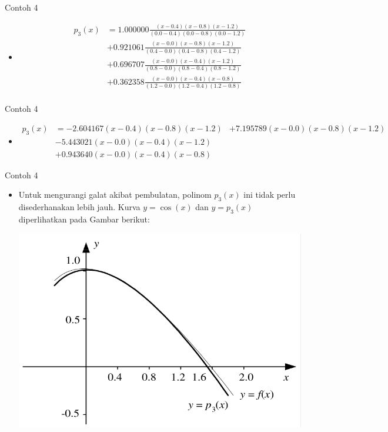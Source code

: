 \documentclass[pdflatex,compress,mathserif]{beamer}
\begin{document}
\begin{frame}{Contoh 4}
	\begin{itemize}
		\item[]
		\begin{align*}
		p_3 (x) &= 1.000000 \frac{(x-0.4)(x-0.8)(x-1.2)}{(0.0-0.4)(0.0-0.8)(0.0-1.2)} \\
		&+ 0.921061 \frac{(x - 0.0 )(x - 0.8)(x - 1.2)}{(0.4 - 0.0)( 0.4 - 0.8 )( 0.4 - 1.2 )} \\
		&+ 0.696707 \frac{(x - 0.0 )(x - 0.4)(x - 1.2)}{(0.8 - 0.0)( 0.8 - 0.4 )( 0.8 - 1.2 )} \\
		&+ 0.362358 \frac{(x - 0.0 )(x - 0.4)(x - 0.8)}{(1.2 - 0.0)( 1.2 - 0.4 )( 1.2 - 0.8 )} \\
		\end{align*}
	\end{itemize}
\end{frame}

\begin{frame}{Contoh 4}
	\begin{itemize}
		\item[]
		\begin{align*}
		p_3 (x) &= - 2.604167 ( x - 0.4 )( x - 0.8 )( x - 1.2 )
		&+ 7.195789 ( x - 0.0 )( x - 0.8 )( x - 1.2 ) \\
		&- 5.443021 ( x - 0.0 )( x - 0.4 )( x - 1.2 )\\
		&+ 0.943640 ( x - 0.0 )( x - 0.4 )( x - 0.8 )
		\end{align*}
	\end{itemize}
\end{frame}

\begin{frame}{Contoh 4}
	\begin{itemize}
		\item Untuk mengurangi galat akibat pembulatan, polinom $ p_3(x) $ ini tidak perlu disederhanakan lebih jauh. Kurva $ y = \cos(x) $ dan $ y = p_3(x) $ diperlihatkan pada Gambar berikut:
		\begin{center}
			\includegraphics[width=0.7\linewidth]{img/img09}
		\end{center}
	\end{itemize}
\end{frame}
\end{document}
